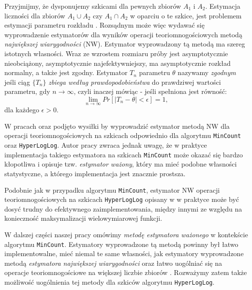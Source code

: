        Przyjmijmy, że dysponujemy szkicami dla pewnych zbiorów $A_1$ i $A_2$. Estymacja liczności dla zbiorów $A_1 \cup A_2$ czy 
       $A_1 \cap A_2$ w oparciu o te szkice, jest problemem estymacji parametru rozkładu \cite{ting}. Rozsądnym może więc wydawać się wyprowadzenie estymatorów dla wyników operacji teoriomnogościowych metodą \textit{największej wiarygodności} (NW).
       Estymator wyprowadzony tą metodą ma szereg istotnych własności. Wraz ze wzrostem rozmiaru próby jest asymptotycznie nieobciążony, asymptotycznie najefektywniejszy, ma asymptotycznie rozkład normalny, a także jest zgodny. Estymator $T_n$ parametru $\theta$ nazywamy \textit{zgodnym} jeśli ciąg $\{T_n\}$ \textit{zbiega według prawdopodobieństwa} 
        do prawdziwej wartości parametru, gdy $n \rightarrow \infty$, czyli inaczej mówiąc - jeśli spełniona jest równość:
       \begin{equation}
     		\lim_{n \to \infty} Pr[|T_n - \theta| < \epsilon] = 1,
     		\label{consistent_def}
       \end{equation}
       dla każdego $\epsilon > 0$.
%      
      
      W pracach \cite{ting} oraz \cite{oertl} podjęto wysiłki
      by wyprowadzić estymator metodą NW dla operacji teoriomnogościowych na szkicach odpowiednio dla algorytmu \texttt{MinCount} oraz \texttt{HyperLogLog}.
      Autor pracy \cite{ting} zwraca jednak uwagę, że
      w praktyce implementacja takiego estymatora na szkicach \texttt{MinCount} może okazać się bardzo kłopotliwa i opisuje tzw. \textit{estymator ważony}, który ma  mieć podobne własności statystyczne, a którego implementacja jest znacznie prostsza. 
  
 Podobnie jak w przypadku algorytmu \texttt{MinCount}, estymator NW operacji teoriomnogościowych na szkicach \texttt{HyperLogLog} opisany w 
 \cite{oertl} w praktyce może być dosyć trudny do efektywnego zaimplementowania, między innymi ze względu na konieczność maksymalizacji wielowymiarowej funkcji.
       
        W dalszej części naszej pracy omówimy  \textit{metodę estymatora ważonego} w kontekście algorytmu 
        \texttt{MinCount}. 
        Estymatory wyprowadzone tą metodą powinny był łatwo implementowalne, mieć niemal te same własności, jak estymatory wyprowadzone metodą \textit{estymatora największej wiarygodności} oraz łatwo uogólniać się na operacje teoriomnogościowe na większej liczbie zbiorów \cite{ting}.         
        Rozważymy zatem także  możliwość uogólnienia tej metody  dla szkiców algorytmu \texttt{HyperLogLog}.
        
        

       
       
       
